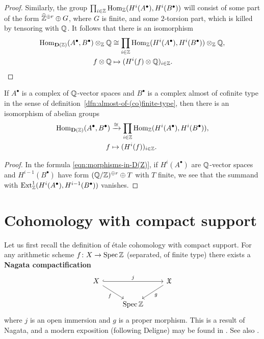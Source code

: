 \documentclass{article}
\numberwithin{equation}{section}
\begin{document}
\begin{appendices}
\begin{lemma}
\begin{proof}
    Similarly, the group
    $\prod_{i\in\mathbb{Z}} \operatorname{Hom}_{\mathbb{Z}} (H^i (A^\bullet), H^i (B^\bullet))$ will consist
    of some part of the form $\widehat{\mathbb{Z}}^{\oplus r} \oplus G$, where $G$
    is finite, and some $2$-torsion part, which is killed by tensoring with
    $\mathbb{Q}$. It follows that there is an isomorphism
    \begin{align*}
      \operatorname{Hom}_{\mathbf{D} (\mathbb{Z})} (A^\bullet, B^\bullet)\otimes_{\mathbb{Z}} \mathbb{Q} & \cong
      \prod_{i\in \mathbb{Z}} \operatorname{Hom}_{\mathbb{Z}} (H^i (A^\bullet), H^i (B^\bullet)) \otimes_{\mathbb{Z}} \mathbb{Q}, \\
      f\otimes\mathbb{Q} & \mapsto (H^i (f) \otimes \mathbb{Q})_{i\in\mathbb{Z}}. \qedhere
    \end{align*}
  \end{proof}
\end{lemma}

\begin{lemma}
  \label{lemma:morphisms-in-DAb-between-cplx-of-Q-vs-and-almost-cofinite-type-cplx}
  If $A^\bullet$ is a complex of $\mathbb{Q}$-vector spaces and $B^\bullet$ is a
  complex almost of cofinite type in the sense of
  definition~\ref{dfn:almost-of-(co)finite-type}, then there is an isomorphism
  of abelian groups
  \begin{align*}
    \operatorname{Hom}_{\mathbf{D} (\mathbb{Z})} (A^\bullet, B^\bullet) & \xrightarrow{\cong}
    \prod_{i\in \mathbb{Z}} \operatorname{Hom}_{\mathbb{Z}} (H^i (A^\bullet), H^i (B^\bullet)),\\
    f & \mapsto (H^i (f))_{i\in \mathbb{Z}}.
  \end{align*}

  \begin{proof}
    In the formula \eqref{eqn:morphisms-in-D(Z)}, if $H^i (A^\bullet)$ are
    $\mathbb{Q}$-vector spaces and $H^{i-1} (B^\bullet)$ have form
    $(\mathbb{Q}/\mathbb{Z})^{\oplus r} \oplus T$ with $T$ finite, we see that the summand with
    $\operatorname{Ext}_{\mathbb{Z}}^1 (H^i (A^\bullet), H^{i-1} (B^\bullet))$ vanishes.
  \end{proof}
\end{lemma}


\pagebreak
\section{Cohomology with compact support}
\label{app:modified-cohomology-with-compact-support}

Let us first recall the definition of étale cohomology with compact support.
For any arithmetic scheme $f\colon X\to \operatorname{Spec} \mathbb{Z}$ (separated, of finite type)
there exists a \textbf{Nagata compactification}
\[ \begin{tikzcd}
X \ar[hookrightarrow]{rr}{j}\ar{dr}[swap]{f} & & \mathfrak{X} \ar{dl}{g} \\
 & \Spec \ZZ
\end{tikzcd} \]
where $j$ is an open immersion and $g$ is a proper morphism. This is a result of
Nagata, and a modern exposition (following Deligne) may be found in
\cite{Conrad-Deligne-Nagata,Conrad-Deligne-Nagata-erratum}. See also
\cite[Exposé~XVII]{SGA4}.


\end{appendices}
\end{document}

